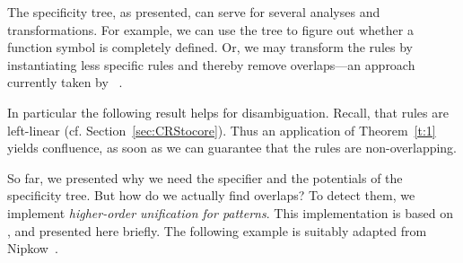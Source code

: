 The specificity tree, as presented, can serve for several analyses and
transformations. For example, we can use the tree to figure out
whether a function symbol is completely defined. Or, we may transform
the rules by instantiating less specific rules and thereby remove
overlaps---an approach currently taken by \crsx~\cite{2011_rose}. 

In particular the following result helps for disambiguation.  Recall,
that \Tosca rules are left-linear
(cf. Section~\ref{sec:CRStocore}).  Thus an application of
Theorem~\ref{t:1} yields confluence, as soon as we can guarantee that
the rules are non-overlapping.

So far, we presented why we need the specifier and the potentials of
the specificity tree. But how do we actually find overlaps?  To detect
them, we implement \emph{higher-order unification for patterns}. This
implementation is based on \cite[Figure~2]{1993_nipkow}, and presented
here briefly.  The following example is suitably adapted from
Nipkow~\cite{1993_nipkow}.

